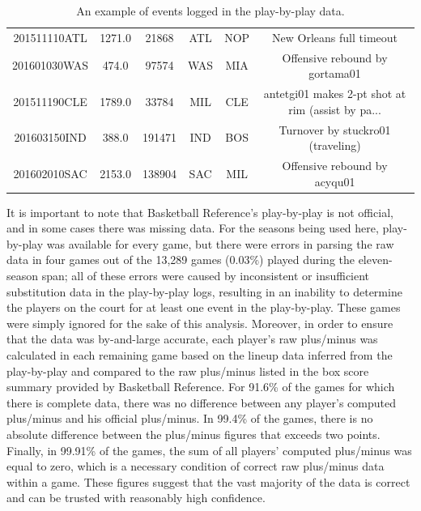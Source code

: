 \begin{table}
{\begin{tabular}{cccccc}
 201511110ATL &        1271.0 &    21868 &      ATL &      NOP & New Orleans full timeout \\
 201601030WAS &         474.0 &    97574 &      WAS &      MIA &                     Offensive rebound by gortama01 \\
 201511190CLE &        1789.0 &    33784 &      MIL &      CLE &  antetgi01 makes 2-pt shot at rim (assist by pa... \\
 201603150IND &         388.0 &   191471 &      IND &      BOS &                  Turnover by stuckro01 (traveling) \\
 201602010SAC &        2153.0 &   138904 &      SAC &      MIL &                       Offensive rebound by acyqu01 \\
\bottomrule
\end{tabular}
    }
    \caption{An example of events logged in the play-by-play data.}
    \label{tab:pbp}
\end{table}

It is important to note that Basketball Reference's play-by-play is not official,
and in some cases there was missing data. For the seasons being used here,
play-by-play was available for every game, but there were errors in parsing the raw
data in four games out of the 13,289 games ($0.03\%$) played during the
eleven-season span; all of these errors were caused by inconsistent or insufficient
substitution data in the play-by-play logs, resulting in an inability to determine
the players on the court for at least one event in the play-by-play. These games
were simply ignored for the sake of this analysis. Moreover, in order to ensure that
the data was by-and-large accurate, each player's raw plus/minus was calculated in
each remaining game based on the lineup data inferred from the play-by-play and
compared to the raw plus/minus listed in the box score summary provided by
Basketball Reference. For 91.6\% of the games for which there is complete data,
there was no difference between any player's computed plus/minus and his official
plus/minus. In 99.4\% of the games, there is no absolute difference between the
plus/minus figures that exceeds two points. Finally, in 99.91\% of the games, the
sum of all players' computed plus/minus was equal to zero, which is a necessary
condition of correct raw plus/minus data within a game. These figures suggest that
the vast majority of the data is correct and can be trusted with reasonably high
confidence.
